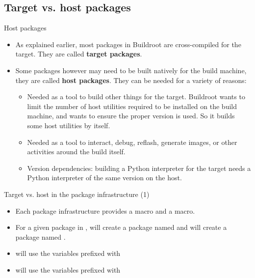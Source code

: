 \subsection{Target vs. host packages}

\begin{frame}{Host packages}

  \begin{itemize}
  \item As explained earlier, most packages in Buildroot are
    cross-compiled for the target. They are called {\bf target
      packages}.
  \item Some packages however may need to be built natively for the
    build machine, they are called {\bf host packages}. They can be
    needed for a variety of reasons:
    \begin{itemize}
    \item Needed as a tool to build other things for the
      target. Buildroot wants to limit the number of host utilities
      required to be installed on the build machine, and wants to ensure
      the proper version is used. So it builds some host utilities by
      itself.
    \item Needed as a tool to interact, debug, reflash, generate images,
      or other activities around the build itself.
    \item Version dependencies: building a Python interpreter for the
      target needs a Python interpreter of the same version on the
      host.
    \end{itemize}
  \end{itemize}
\end{frame}

\begin{frame}{Target vs. host in the package infrastructure (1)}
  \begin{itemize}
  \item Each package infrastructure provides a 
    macro and a  macro.
  \item For a given package in ,
     will create a package named  and
     will create a package named
    .
  \item {} will use the variables prefixed with
  \item {} will use the variables prefixed with
  \end{itemize}
\end{frame}


